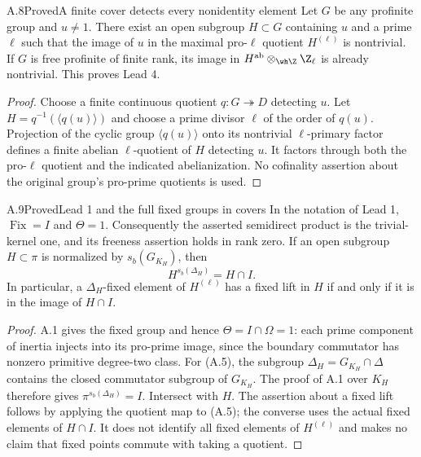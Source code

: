 \begin{statement}{A.8}{Proved}{A finite cover detects every nonidentity element}
Let $G$ be any profinite group and $u\ne1$. There exist an open subgroup
$H\subset G$ containing $u$ and a prime $\ell$ such that the image of
$u$ in the maximal pro-$\ell$ quotient $H^{(\ell)}$ is nontrivial.
If $G$ is free profinite of finite rank, its image in
$H^{\rm ab}\otimes_{\wh\Z}\Z_\ell$ is already nontrivial.
This proves Lead 4.
\end{statement}
\begin{proof}
Choose a finite continuous quotient $q:G\twoheadrightarrow D$ detecting $u$.
Let $H=q^{-1}(\langle q(u)\rangle)$ and choose a prime divisor $\ell$
of the order of $q(u)$. Projection of the cyclic group
$\langle q(u)\rangle$ onto its nontrivial $\ell$-primary factor defines
a finite abelian $\ell$-quotient of $H$ detecting $u$. It factors through
both the pro-$\ell$ quotient and the indicated abelianization. No
cofinality assertion about the original group's pro-prime quotients is used.
\end{proof}

\begin{statement}{A.9}{Proved}{Lead 1 and the full fixed groups in covers}
In the notation of Lead 1, $\operatorname{Fix}=I$ and $\Theta=1$.
Consequently the asserted semidirect product is the trivial-kernel one,
and its freeness assertion holds in rank zero. If an open subgroup
$H\subset\pi$ is normalized by $s_b(G_{K_H})$, then
\[
                  H^{s_b(\Delta_H)}=H\cap I.             \tag{A.5}
\]
In particular, a $\Delta_H$-fixed element of $H^{(\ell)}$ has a fixed
lift in $H$ if and only if it is in the image of $H\cap I$.
\end{statement}
\begin{proof}
A.1 gives the fixed group and hence $\Theta=I\cap\Omega=1$:
each prime component of inertia injects into its pro-prime image, since
the boundary commutator has nonzero primitive degree-two class.
For (A.5), the subgroup $\Delta_H=G_{K_H}\cap\Delta$ contains the closed
commutator subgroup of $G_{K_H}$. The proof of A.1 over $K_H$ therefore
gives $\pi^{s_b(\Delta_H)}=I$. Intersect with $H$.
The assertion about a fixed lift follows by applying the quotient map to
(A.5); the converse uses the actual fixed elements of $H\cap I$.
It does not identify all fixed elements of $H^{(\ell)}$ and makes no
claim that fixed points commute with taking a quotient.
\end{proof}


